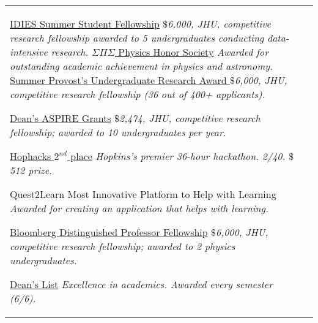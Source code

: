 \documentclass[10pt]{article} %
\begin{document}
\begin{longtable}{L{4cm}@{\hskip 0.15in}L{13.5cm}}
{\href{https://www.idies.jhu.edu/what-we-offer/funding/idies-summer-student-fellowship/}{IDIES Summer Student Fellowship}} %
{\textit{$\$$6,000, JHU, competitive research fellowship awarded to 5 undergraduates conducting data-intensive research.}}
{\href{https://www.sigmapisigma.org/sigmapisigma}{$\Sigma\Pi\Sigma$ Physics Honor Society}} %
{\textit{Awarded for outstanding academic achievement in physics and astronomy.}}
{\href{https://hour.jhu.edu/opportunities/summerpura/}{Summer Provost’s Undergraduate Research Award }} %
{\textit{$\$$6,000, JHU, competitive research fellowship (36 out of 400+ applicants).}} %

{\href{https://krieger.jhu.edu/ursca/projects/aspire-grant/}{Dean's ASPIRE Grants}} %
{\textit{$\$$2,474, JHU, competitive research fellowship; awarded to 10 undergraduates per year.}} %

{\href{https://hophacks.com/}{Hophacks $2^{nd}$ place}} %
{\textit{Hopkins's premier 36-hour hackathon. 2/40. $\$$512 prize.}} %

{Quest2Learn Most Innovative Platform to Help with Learning }
{\textit{Awarded for creating an application that helps with learning.}}


{\href{https://hour.jhu.edu/opportunities/bdpsp/}{Bloomberg Distinguished Professor Fellowship}}
{\textit{$\$$6,000, JHU, competitive research fellowship; awarded to 2 physics undergraduates.}}

{\href{https://advising.jhu.edu/student-roadmap/seniors/honors/}{Dean's List}}
{\textit{Excellence in academics. Awarded every semester (6/6).}}
\end{longtable}

	
	
\end{document}
